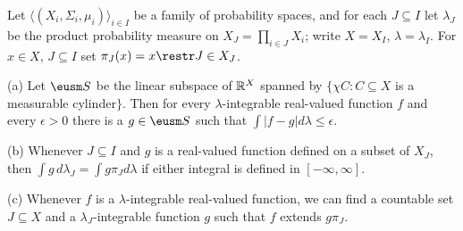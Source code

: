  Let $\langle(X_i,\Sigma_i,\mu_i)\rangle_{i\in
I}$ be a family of probability spaces, and for each $J\subseteq I$ let
$\lambda_J$ be the product probability measure on $X_J=\prod_{i\in
J}X_i$;  write $X=X_I$, $\lambda=\lambda_I$.   For $x\in X$, $J\subseteq
I$ set $\pi_J(x)=x\restr J\in X_J$.

(a) Let $\eusm S$ be the linear subspace of $\Bbb R^X$ spanned by
$\{\chi C:C\subseteq X$ is a measurable cylinder$\}$.   Then for every
$\lambda$-integrable real-valued function $f$ and every $\epsilon>0$
there is a $g\in\eusm S$ such that $\int|f-g|d\lambda\le\epsilon$.

(b) Whenever $J\subseteq I$ and $g$ is a real-valued function defined on
a subset of $X_J$, then $\int g\,d\lambda_J=\int g\pi_Jd\lambda$ if
either integral is defined in $[-\infty,\infty]$.

(c) Whenever $f$ is a $\lambda$-integrable real-valued function, we can
find a countable set $J\subseteq X$ and a
$\lambda_J$-integrable function $g$ such that $f$ extends $g\pi_J$.


